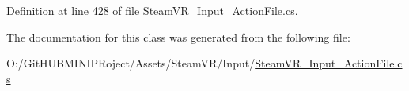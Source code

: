 Definition at line 428 of file Steam\+V\+R\+\_\+\+Input\+\_\+\+Action\+File.\+cs.



The documentation for this class was generated from the following file\+:\begin{DoxyCompactItemize}
\item 
O\+:/\+Git\+H\+U\+B\+M\+I\+N\+I\+P\+Roject/\+Assets/\+Steam\+V\+R/\+Input/\mbox{\hyperlink{_steam_v_r___input___action_file_8cs}{Steam\+V\+R\+\_\+\+Input\+\_\+\+Action\+File.\+cs}}\end{DoxyCompactItemize}
